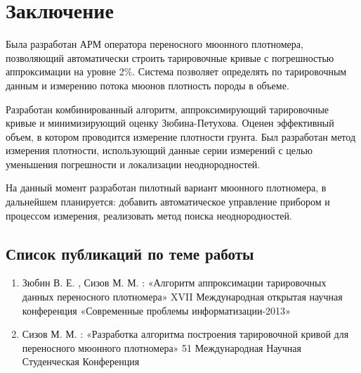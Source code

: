 \chapter*{Заключение}						%

Была разработан АРМ оператора переносного мюонного плотномера, позволяющий автоматически строить тарировочные кривые с
погрешностью аппроксимации на уровне 2\%. Система позволяет определять по тарировочным данным и измерению потока мюонов 
плотность породы в объеме. 

Разработан комбинированный алгоритм, аппроксимирующий тарировочные кривые и минимизирующий оценку Зюбина-Петухова. Оценен эффективный объем, в котором проводится измерение плотности грунта. Был разработан 
метод измерения плотности, использующий данные серии измерений с целью уменьшения погрешности и локализации 
неоднородностей.

На данный момент разработан пилотный вариант мюонного плотномера, в дальнейшем планируется: добавить автоматическое 
управление прибором и процессом измерения, реализовать метод поиска неоднородностей.

\section*{Список публикаций по теме работы}						%

\begin{enumerate}

\item Зюбин В. Е. , Сизов М. М. : «Алгоритм аппроксимации тарировочных данных переносного плотномера» XVII Международная открытая научная конференция «Современные проблемы информатизации-2013»

\item Сизов М. М. : «Разработка алгоритма построения тарировочной кривой для переносного мюонного плотномера» 51 Международная Научная Студенческая Конференция 
\end{enumerate}

\clearpage